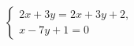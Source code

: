 \begin{ex}
	\begin{condition}
		\( \left\{
		\begin{array}{l}
			2x+3y=2x+3y+2,\\
			x-7y+1=0
		\end{array}
		\right.\)
	\end{condition}
\end{ex}